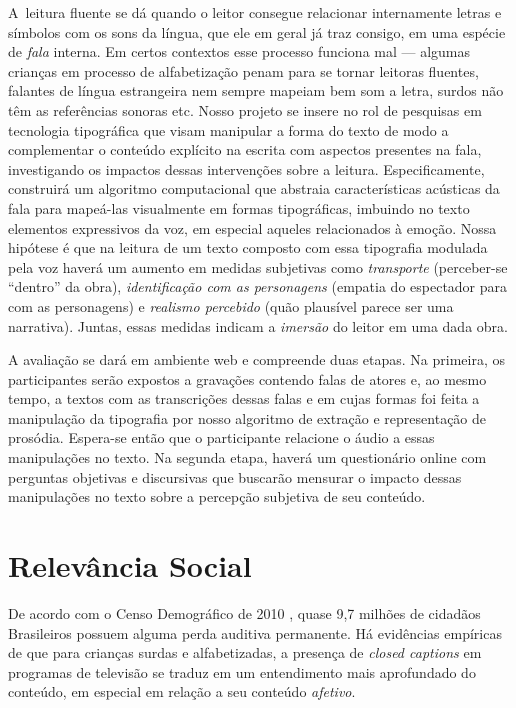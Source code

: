 \documentclass[a4paper,11pt,titlepage,singlespacing]{article}
\begin{document}
\newpage

\abstract

\noindent A~leitura fluente se dá quando o leitor consegue relacionar internamente letras e símbolos com os sons da língua, que ele em geral já traz consigo, em uma espécie de \textit{fala} interna. Em certos contextos esse processo funciona mal — algumas crianças em processo de alfabetização penam para se tornar leitoras fluentes, falantes de língua estrangeira nem sempre mapeiam bem som a letra, surdos não têm as referências sonoras etc. Nosso projeto se insere no rol de pesquisas em tecnologia tipográfica que visam manipular a forma do texto de modo a complementar o conteúdo explícito na escrita com aspectos presentes na fala, investigando os impactos dessas intervenções sobre a leitura. Especificamente, construirá um algoritmo computacional que abstraia características acústicas da fala para mapeá-las visualmente em formas tipográficas, imbuindo no texto elementos expressivos da voz, em especial aqueles relacionados à emoção. Nossa hipótese é que na leitura de um texto composto com essa tipografia modulada pela voz haverá um aumento em medidas subjetivas como \textit{transporte} (perceber-se ``dentro'' da obra), \textit{identificação com as personagens} (empatia do espectador para com as personagens) e \textit{realismo percebido} (quão plausível parece ser uma narrativa). Juntas, essas medidas indicam a \textit{imersão} do leitor em uma dada obra. 

A avaliação se dará em ambiente web e compreende duas etapas. Na primeira, os participantes serão expostos a gravações contendo falas de atores e, ao mesmo tempo, a textos com as transcrições dessas falas e em cujas formas foi feita a manipulação da tipografia por nosso algoritmo de extração e representação de prosódia. Espera-se então que o participante relacione o áudio a essas manipulações no texto. Na segunda etapa, haverá um questionário online com perguntas objetivas e discursivas que buscarão mensurar o impacto dessas manipulações no texto sobre a percepção subjetiva de seu conteúdo.

\newpage


\thispagestyle{empty}
\newpage


\newpage

\section*{Relevância Social}

\noindent De acordo com o Censo Demográfico de 2010 \cite{censo2010}, quase 9,7 milhões de cidadãos Brasileiros possuem alguma perda auditiva permanente. Há evidências empíricas \cite{murphy-berman_impact_1983} de que para crianças surdas e alfabetizadas, a presença de \textit{closed captions} em programas de televisão se traduz em um entendimento mais aprofundado do conteúdo, em especial em relação a seu conteúdo \textit{afetivo}.
\end{document}
